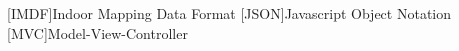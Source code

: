 \section*{
}

\begin{acronym}
	[IMDF]{Indoor Mapping Data Format}
	[JSON]{Javascript Object Notation}
	[MVC]{Model-View-Controller}
\end{acronym}

\clearpage
